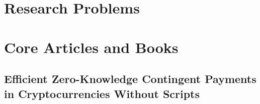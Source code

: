 
\section{Research Problems}
\label{sec:research problems}



\section{Core Articles and Books}
\label{sec:core articles and books}

\subsection{Efficient Zero-Knowledge Contingent Payments in Cryptocurrencies Without Scripts\cite{Banasik2016}}


